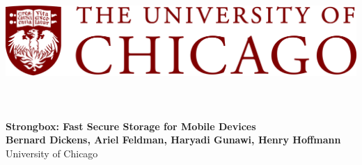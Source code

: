 \documentclass[a0,portrait]{a0poster}
\begin{document}


\begin{minipage}[b]{\linewidth}

\includegraphics[height=5cm]{figures/uchicago_logo.png}
\vspace{0.1cm}
\begin{center}
\noindent\makebox[\linewidth]{\rule{0.9\paperwidth}{0.4pt}}
\vspace{0.1cm}
\end{center}

\veryHuge \color{NavyBlue} \textbf{Strongbox: Fast Secure Storage for Mobile Devices} \color{Black}\\[0.5cm] %
\huge \textbf{Bernard Dickens, Ariel Feldman, Haryadi Gunawi, Henry Hoffmann}\\[0.25cm] %
\Large University of Chicago %
\end{minipage}

\vspace{1cm} %

\end{document}
